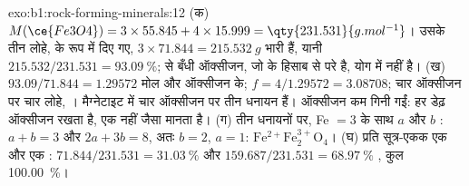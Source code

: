 \begin{solution}{exo:b1:rock-forming-minerals:12}
(क) $M(\ce{Fe3O4}) = 3\times55.845 + 4\times15.999 = \qty{231.531}{g.mol^{-1}}$।
उसके तीन लोहे,  के रूप में दिए गए, $3\times71.844 = \qty{215.532}{g}$ भारी हैं,
यानी $215.532/231.531 = \qty{93.09}{\percent}$;  से बँधी ऑक्सीजन, जो  के हिसाब से परे है, योग में
नहीं है। (ख) $93.09/71.844 = 1.29572$ मोल  और ऑक्सीजन के; $f =
4/1.29572 = 3.08708$; चार ऑक्सीजन पर चार लोहे, । मैग्नेटाइट में चार ऑक्सीजन पर तीन धनायन हैं। ऑक्सीजन कम
गिनी गईं: हर  डेढ़ ऑक्सीजन रखता है, एक नहीं जैसा  मानता है। (ग) तीन धनायनों पर, Fe $= 3$
के साथ $a$  और $b$ : $a + b = 3$ और $2a + 3b = 8$,
अतः $b = 2$, $a = 1$: $\mathrm{Fe^{2+}Fe^{3+}_2O_4}$। (घ) प्रति सूत्र-एकक एक  और
एक : $71.844/231.531 = \qty{31.03}{\percent}$
 और $159.687/231.531 = \qty{68.97}{\percent}$ , कुल
\qty{100.00}{\percent}।
\end{solution}

